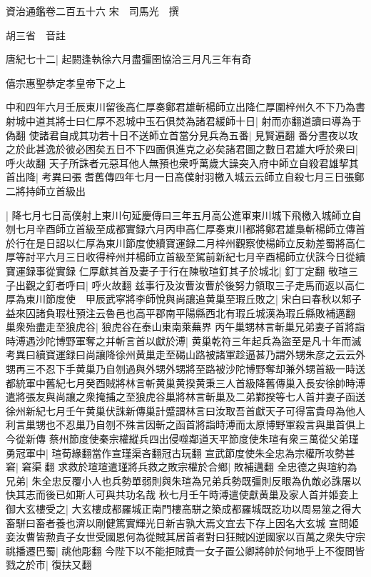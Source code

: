 資治通鑑卷二百五十六
宋　司馬光　撰

胡三省　音註

唐紀七十二|{
	起閼逢執徐六月盡彊圉協洽三月凡三年有奇}


僖宗惠聖恭定孝皇帝下之上

中和四年六月壬辰東川留後高仁厚奏鄭君雄斬楊師立出降仁厚圍梓州久不下乃為書射城中道其將士曰仁厚不忍城中玉石俱焚為諸君緩師十日|{
	射而亦翻道讀曰導為于偽翻}
使諸君自成其功若十日不送師立首當分見兵為五番|{
	見賢遍翻}
番分晝夜以攻之於此甚逸於彼必困矣五日不下四面俱進克之必矣諸君圖之數日君雄大呼於衆曰|{
	呼火故翻}
天子所誅者元惡耳他人無預也衆呼萬歲大譟突入府中師立自殺君雄挈其首出降|{
	考異曰張耆舊傳四年七月一日高僕射羽檄入城云云師立自殺七月三日張鄭二將持師立首級出}


|{
	降七月七日高僕射上東川句延慶傳曰三年五月高公進軍東川城下飛檄入城師立自刎七月辛酉師立首級至成都實録六月丙申高仁厚奏東川都將鄭君雄梟斬楊師立傳首於行在是日詔以仁厚為東川節度使續寶運録二月梓州觀察使楊師立反勑差蜀將高仁厚等討平六月三日收得梓州并楊師立首級至駕前新紀七月辛酉楊師立伏誅今日從續寶運録事從實録}
仁厚獻其首及妻子于行在陳敬瑄釘其子於城北|{
	釘丁定翻}
敬瑄三子出觀之釘者呼曰|{
	呼火故翻}
兹事行及汝曹汝曹於後努力領取三子走馬而返以高仁厚為東川節度使　甲辰武寜將李師悅與尚讓追黄巢至瑕丘敗之|{
	宋白曰春秋以邾子益來囚諸負瑕杜預注云魯邑也高平郡南平陽縣西北有瑕丘城漢為瑕丘縣敗補邁翻}
巢衆殆盡走至狼虎谷|{
	狼虎谷在泰山東南萊蕪界}
丙午巢甥林言斬巢兄弟妻子首將詣時溥遇沙陀博野軍奪之并斬言首以獻於溥|{
	黄巢乾符三年起兵為盜至是凡十年而滅　考異曰續寶運録曰尚讓降徐州黄巢走至碣山路被諸軍趁逼甚乃謂外甥朱彦之云云外甥再三不忍下手黄巢乃自刎過與外甥外甥將至路被沙陀博野奪却兼外甥首級一時送都統軍中舊紀七月癸酉賊將林言斬黄巢黄揆黄秉三人首級降舊傳巢入長安徐帥時溥遣將張友與尚讓之衆掩捕之至狼虎谷巢將林言斬巢及二弟鄴揆等七人首并妻子函送徐州新紀七月壬午黄巢伏誅新傳巢計蹙謂林言曰汝取吾首獻天子可得富貴母為他人利言巢甥也不忍巢乃自刎不殊言因斬之函首將詣時溥而太原博野軍殺言與巢首俱上今從新傳}
蔡州節度使秦宗權縱兵四出侵噬鄰道天平節度使朱瑄有衆三萬從父弟瑾勇冠軍中|{
	瑄荀緣翻當作宣瑾渠吝翻冠古玩翻}
宣武節度使朱全忠為宗權所攻勢甚窘|{
	窘渠翻}
求救於瑄瑄遣瑾將兵救之敗宗權於合鄉|{
	敗補邁翻}
全忠德之與瑄約為兄弟|{
	朱全忠反覆小人也兵勢單弱則與朱瑄為兄弟兵勢既彊則反眼為仇敵必誅屠以快其志而後已如斯人可與共功名哉}
秋七月壬午時溥遣使獻黄巢及家人首并姬妾上御大玄樓受之|{
	大玄樓成都羅城正南門樓高駢之築成都羅城既訖功以周易筮之得大畜駢曰畜者養也濟以剛健篤實輝光日新吉孰大焉文宜去下存上因名大玄城}
宣問姬妾汝曹皆勲貴子女世受國恩何為從賊其居首者對曰狂賊凶逆國家以百萬之衆失守宗祧播遷巴蜀|{
	祧他彫翻}
今陛下以不能拒賊責一女子置公卿將帥於何地乎上不復問皆戮之於市|{
	復扶又翻}
